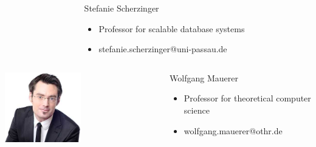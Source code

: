 \documentclass[12pt]{beamer}
\begin{document}
\begin{frame}
\begin{minipage}[c]{1.0\linewidth}
\begin{columns}
\begin{column}{0.35\textwidth}
\begin{center}
			\end{center}
		\end{column}
		\begin{column}{0.7\textwidth}
		\begin{block}{Stefanie Scherzinger}
			\begin{itemize}
				\item Professor for scalable database systems
				\item stefanie.scherzinger@uni-passau.de
			\end{itemize}
		\end{block}
		\end{column}
		\end{columns}
	\end{minipage}
	\begin{minipage}[c]{1.0\linewidth}
		\begin{columns}
		\begin{column}{0.35\textwidth}
			\begin{center}
     		\includegraphics[width=0.5\textwidth]{pics/speakers_mauerer.jpeg}
			\end{center}
		\end{column}
		\begin{column}{0.7\textwidth}
		\begin{block}{Wolfgang Mauerer}
			\begin{itemize}
				\item Professor for theoretical computer science
				\item wolfgang.mauerer@othr.de
			\end{itemize}
		\end{block}
		\end{column}
		\end{columns}

	\end{minipage}
	\end{frame}
\end{document}

